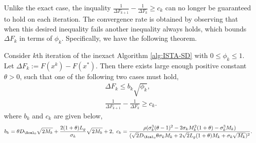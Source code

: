 \documentclass[11pt]{article}
\numberwithin{equation}{section}
\begin{document}
Unlike the exact case, the inquality 
$\frac{1}{\Delta F_{k+1}}-\frac{1}{\Delta F_{k}}\geq c_k$ can no longer be guaranteed to hold on each iteration. 
The convergence rate is obtained by observing that when this desired inequality fails another inequality always holds, which bounds 
$\Delta F_{k}$ in terms of $\phi_k$. Specifically, we have the following theorem.
\begin{lemma}
\label{lem:bound_iter_inexact}
	Consider $k$th iteration of the inexact Algorithm \ref{alg:ISTA-SD} with $0 \leq \phi_k\leq 1$. Let $\Delta F_k := F(x^k) - F(x^*)$. Then there exists large enough positive constant $\theta > 0$, such that one of the following two cases must hold,
	\begin{align}
		\label{equ:bound_F_inexact_case1}
	    &\Delta F_k \leq b_k\sqrt{\phi_k}, \\
	    \label{equ:bound_F_inexact_case2}
	    &\frac{1}{\Delta F_{k+1}}-\frac{1}{\Delta F_{k}}\geq c_k.
	\end{align}
	where $b_k$ and $c_k$ are given below,
	\begin{align}
	\label{equ:bound_bk_ck}
	    b_k = \theta D_{\Xcal_0}\sqrt{2M_k}+  \frac{2(1+\theta)L_g}{\sigma_k}\sqrt{2M_k} + 2, 
	    ~
	    c_k=\frac{\rho(\sigma_k^3(\theta-1)^2 - 2\sigma_kM_k^2(1+\theta) - \sigma_k^3M_k )}{(\sqrt{2}D_{\Xcal_0}\theta\sigma_kM_k + 2\sqrt{2}L_g(1+\theta)M_k + \sigma_k\sqrt{M_k} )^2}.
	\end{align}
\end{lemma}
\end{document}
